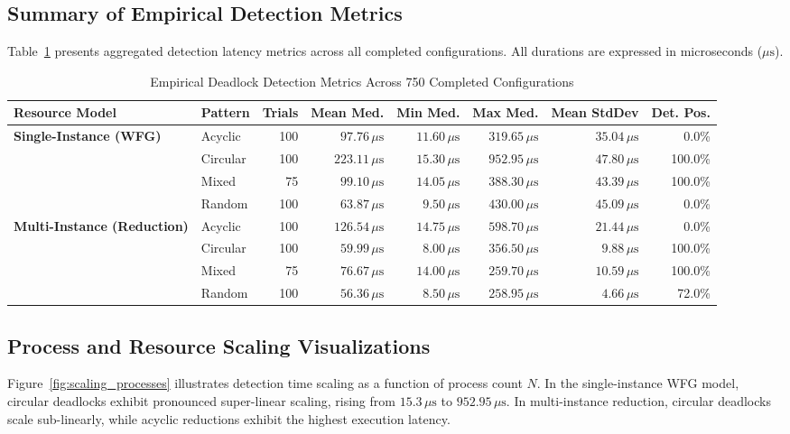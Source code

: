 \documentclass[11pt,a4paper]{article}
\begin{document}
\subsection{Summary of Empirical Detection Metrics}
Table~\ref{tab:results_summary} presents aggregated detection latency metrics across all completed configurations. All durations are expressed in microseconds ($\mu\text{s}$).

\begin{table}[H]
\centering
\caption{Empirical Deadlock Detection Metrics Across 750 Completed Configurations}
\label{tab:results_summary}
\small
\begin{tabularx}{\textwidth}{llrrrrrr}
\toprule
\textbf{Resource Model} & \textbf{Pattern} & \textbf{Trials} & \textbf{Mean Med.} & \textbf{Min Med.} & \textbf{Max Med.} & \textbf{Mean StdDev} & \textbf{Det. Pos.} \\
\midrule
\multirow{4}{*}{\textbf{Single-Instance (WFG)}} 
 & Acyclic  & 100 & $97.76\,\mu\text{s}$ & $11.60\,\mu\text{s}$ & $319.65\,\mu\text{s}$ & $35.04\,\mu\text{s}$ & 0.0\% \\
 & Circular & 100 & $223.11\,\mu\text{s}$ & $15.30\,\mu\text{s}$ & $952.95\,\mu\text{s}$ & $47.80\,\mu\text{s}$ & 100.0\% \\
 & Mixed    & 75  & $99.10\,\mu\text{s}$ & $14.05\,\mu\text{s}$ & $388.30\,\mu\text{s}$ & $43.39\,\mu\text{s}$ & 100.0\% \\
 & Random   & 100 & $63.87\,\mu\text{s}$ & $9.50\,\mu\text{s}$  & $430.00\,\mu\text{s}$ & $45.09\,\mu\text{s}$ & 0.0\% \\
\midrule
\multirow{4}{*}{\textbf{Multi-Instance (Reduction)}} 
 & Acyclic  & 100 & $126.54\,\mu\text{s}$ & $14.75\,\mu\text{s}$ & $598.70\,\mu\text{s}$ & $21.44\,\mu\text{s}$ & 0.0\% \\
 & Circular & 100 & $59.99\,\mu\text{s}$  & $8.00\,\mu\text{s}$  & $356.50\,\mu\text{s}$ & $9.88\,\mu\text{s}$  & 100.0\% \\
 & Mixed    & 75  & $76.67\,\mu\text{s}$  & $14.00\,\mu\text{s}$ & $259.70\,\mu\text{s}$ & $10.59\,\mu\text{s}$ & 100.0\% \\
 & Random   & 100 & $56.36\,\mu\text{s}$  & $8.50\,\mu\text{s}$  & $258.95\,\mu\text{s}$ & $4.66\,\mu\text{s}$  & 72.0\% \\
\bottomrule
\end{tabularx}
\end{table}

\subsection{Process and Resource Scaling Visualizations}
Figure~\ref{fig:scaling_processes} illustrates detection time scaling as a function of process count $N$. In the single-instance WFG model, circular deadlocks exhibit pronounced super-linear scaling, rising from $15.3\,\mu\text{s}$ to $952.95\,\mu\text{s}$. In multi-instance reduction, circular deadlocks scale sub-linearly, while acyclic reductions exhibit the highest execution latency.
\end{document}
